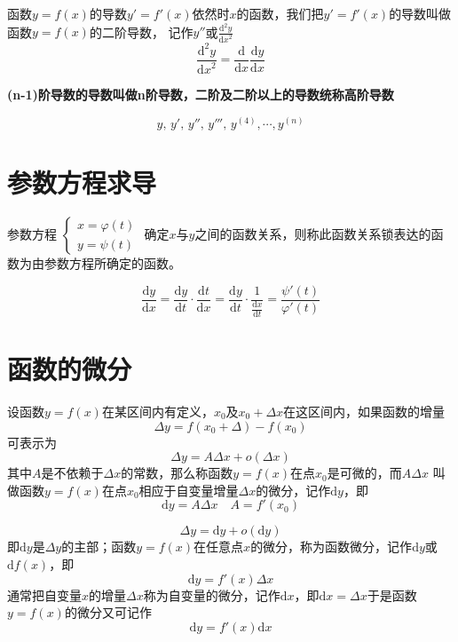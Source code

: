 \documentclass[UTF8]{ctexart}
\newcommand{\D}{\text{d}}
\begin{document}
函数$y=f(x)$的导数$y'=f'(x)$依然时$x$的函数，我们把$y'=f'(x)$的导数叫做函数$y=f(x)$的二阶导数，
记作$y''$或$\frac{\D^2y}{{\D x}^2}$
\[ \frac{\D^2y}{{\D x}^2} = \frac{\D}{\D x}\frac{\D y}{\D x} \]

\textbf{(n-1)阶导数的导数叫做n阶导数，二阶及二阶以上的导数统称高阶导数}

\[y,\,y',\,y'',\,y''',\,y^{(4)},\cdots,y^{(n)}\]
\bigskip
\bigskip

\section*{参数方程求导}

\bigskip

参数方程
$\begin{cases}
x=\varphi(t)\\
y=\psi(t)
\end{cases}$
确定$x$与$y$之间的函数关系，则称此函数关系锁表达的函数为由参数方程所确定的函数。

\[ \frac{\D y}{\D x}=\frac{\D y}{\D t}\cdot\frac{\D t}{\D x}=\frac{\D y}{\D t}\cdot\frac{1}{\frac{\D x}{\D t}}=\frac{\psi'(t)}{\varphi'(t)} \]
\bigskip
\bigskip

\section*{函数的微分}

\bigskip

设函数$y=f(x)$在某区间内有定义，$x_0$及$x_0+\Delta x$在这区间内，如果函数的增量
\[ \Delta y = f(x_0+\Delta)-f(x_0) \]
可表示为
\[ \Delta y = A\Delta x+o(\Delta x) \]
其中$A$是不依赖于$\Delta x$的常数，那么称函数$y=f(x)$在点$x_0$是可微的，而$A\Delta x$
叫做函数$y=f(x)$在点$x_0$相应于自变量增量$\Delta x$的微分，记作$\D y$，即
\[ \D y = A\Delta x \quad A=f'(x_0)\]

\[ \Delta y = \D y + o(\D y) \]
即$\D y$是$\Delta y$的主部；函数$y=f(x)$在任意点$x$的微分，称为函数微分，记作$\D y$或$\D f(x)$，即
\[ \D y = f'(x)\Delta x \]
通常把自变量$x$的增量$\Delta x$称为自变量的微分，记作$\D x$，即$\D x=\Delta x$于是函数$y=f(x)$的微分又可记作
\[ \D y = f'(x)\D x \]
\end{document}
